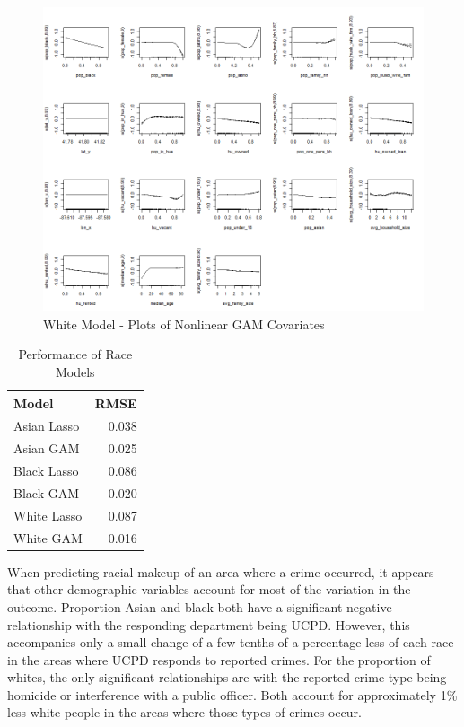 \documentclass{ucetd}
\begin{document}
\begin{figure}
\centering
\includegraphics[width=1\textwidth,height=\textheight]{..//Modeling/modeling_files/figure-gfm/gam-white-1.png}
\caption{White Model - Plots of Nonlinear GAM Covariates}
\end{figure}

\begin{table}

\caption{\label{tab:race-performance}Performance of Race Models}
\centering
\begin{tabular}[t]{l|r}
\hline
Model & RMSE\\
\hline
Asian Lasso & 0.038\\
\hline
Asian GAM & 0.025\\
\hline
Black Lasso & 0.086\\
\hline
Black GAM & 0.020\\
\hline
White Lasso & 0.087\\
\hline
White GAM & 0.016\\
\hline
\end{tabular}
\end{table}

When predicting racial makeup of an area where a crime occurred, it
appears that other demographic variables account for most of the
variation in the outcome. Proportion Asian and black both have a
significant negative relationship with the responding department being
UCPD. However, this accompanies only a small change of a few tenths of a
percentage less of each race in the areas where UCPD responds to
reported crimes. For the proportion of whites, the only significant
relationships are with the reported crime type being homicide or
interference with a public officer. Both account for approximately 1\%
less white people in the areas where those types of crimes occur.
\end{document}
